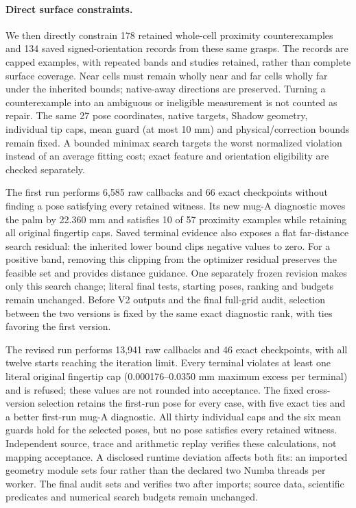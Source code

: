 \paragraph{Direct surface constraints.}

We then directly constrain 178 retained whole-cell proximity counterexamples
and 134 saved signed-orientation records from these same grasps. The records
are capped examples, with repeated bands and studies retained, rather than
complete surface coverage. Near cells must remain wholly near and far cells
wholly far under the inherited bounds; native-away directions are preserved.
Turning a counterexample into an ambiguous or ineligible measurement is not
counted as repair. The same 27 pose coordinates, native targets, Shadow
geometry, individual tip caps, mean guard (at most 10 mm) and physical/correction bounds remain
fixed. A bounded minimax search targets the worst normalized violation instead
of an average fitting cost; exact feature and orientation eligibility are
checked separately.

The first run performs 6,585 raw callbacks and 66 exact checkpoints without
finding a pose satisfying every retained witness. Its new mug-A diagnostic
moves the palm by 22.360 mm and satisfies 10 of 57 proximity examples while
retaining all original fingertip caps. Saved terminal evidence also exposes a
flat far-distance search residual: the inherited lower bound clips negative
values to zero. For a positive band, removing this clipping from the optimizer
residual preserves the feasible set and provides distance guidance. One
separately frozen revision makes only this search change; literal final tests,
starting poses, ranking and budgets remain unchanged. Before V2 outputs and the final full-grid audit, selection between the two versions is fixed
by the same exact diagnostic rank, with ties favoring the first version.

The revised run performs 13,941 raw callbacks and 46 exact checkpoints, with
all twelve starts reaching the iteration limit. Every terminal violates at
least one literal original fingertip cap (0.000176--0.0350 mm maximum excess
per terminal) and is refused; these values are not rounded into acceptance.
The fixed cross-version selection retains the first-run pose for every case,
with five exact ties and a better first-run mug-A diagnostic. All thirty
individual caps and the six mean guards hold for the selected poses, but no
pose satisfies every retained witness. Independent source, trace and
arithmetic replay verifies these calculations, not mapping acceptance.
A disclosed runtime deviation affects both fits: an imported geometry module
sets four rather than the declared two Numba threads per worker. The final
audit sets and verifies two after imports; source data, scientific predicates
and numerical search budgets remain unchanged.

